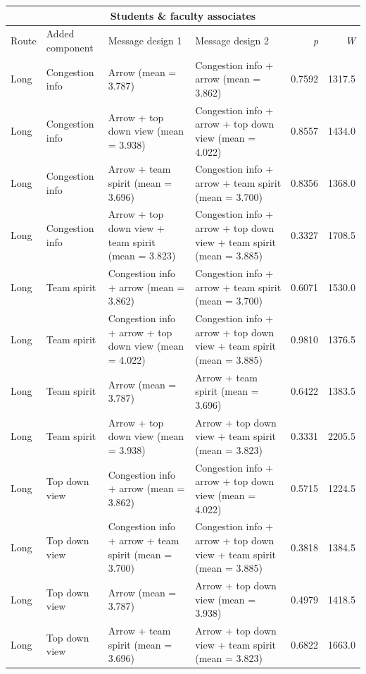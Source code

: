 \begin{table}
\begin{scriptsize}

\hspace{-3.0cm}
\begin{tabular}{llllrr}
\multicolumn{6}{c}{\textbf{Students \& faculty associates}} \\
\hline
 Route & Added component & Message design 1 & Message design 2 & \textit{p} &  \textit{W} \\ 
  \hline
Long & Congestion info & Arrow (mean = 3.787) & Congestion info + arrow (mean = 3.862) & 0.7592 & 1317.5 \\ 
  Long & Congestion info & Arrow + top down view (mean = 3.938) & Congestion info + arrow + top down view (mean = 4.022) & 0.8557 & 1434.0 \\ 
  Long & Congestion info & Arrow + team spirit (mean = 3.696) & Congestion info + arrow + team spirit (mean = 3.700) & 0.8356 & 1368.0 \\ 
  Long & Congestion info & Arrow + top down view + team spirit (mean = 3.823) & Congestion info + arrow + top down view + team spirit (mean = 3.885) & 0.3327 & 1708.5 \\ 
  Long & Team spirit & Congestion info + arrow (mean = 3.862) & Congestion info + arrow + team spirit (mean = 3.700) & 0.6071 & 1530.0 \\ 
  Long & Team spirit & Congestion info + arrow + top down view (mean = 4.022) & Congestion info + arrow + top down view + team spirit (mean = 3.885) & 0.9810 & 1376.5 \\ 
  Long & Team spirit & Arrow (mean = 3.787) & Arrow + team spirit (mean = 3.696) & 0.6422 & 1383.5 \\ 
  Long & Team spirit & Arrow + top down view (mean = 3.938) & Arrow + top down view + team spirit (mean = 3.823) & 0.3331 & 2205.5 \\ 
  Long & Top down view & Congestion info + arrow (mean = 3.862) & Congestion info + arrow + top down view (mean = 4.022) & 0.5715 & 1224.5 \\ 
  Long & Top down view & Congestion info + arrow + team spirit (mean = 3.700) & Congestion info + arrow + top down view + team spirit (mean = 3.885) & 0.3818 & 1384.5 \\ 
  Long & Top down view & Arrow (mean = 3.787) & Arrow + top down view (mean = 3.938) & 0.4979 & 1418.5 \\ 
  Long & Top down view & Arrow + team spirit (mean = 3.696) & Arrow + top down view + team spirit (mean = 3.823) & 0.6822 & 1663.0 \\ 

\end{tabular}
\end{scriptsize}
\end{table}
